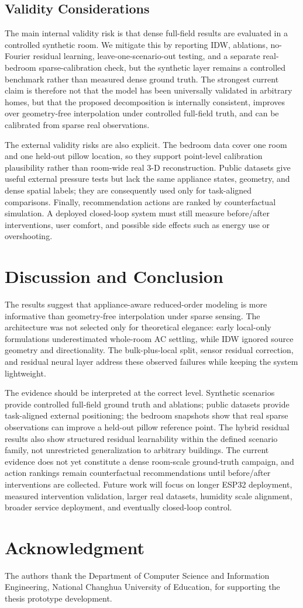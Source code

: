 \documentclass[conference]{IEEEtran}
\begin{document}
\subsection{Validity Considerations}
The main internal validity risk is that dense full-field results are evaluated in a controlled synthetic room. We mitigate this by reporting IDW, ablations, no-Fourier residual learning, leave-one-scenario-out testing, and a separate real-bedroom sparse-calibration check, but the synthetic layer remains a controlled benchmark rather than measured dense ground truth. The strongest current claim is therefore not that the model has been universally validated in arbitrary homes, but that the proposed decomposition is internally consistent, improves over geometry-free interpolation under controlled full-field truth, and can be calibrated from sparse real observations.

The external validity risks are also explicit. The bedroom data cover one room and one held-out pillow location, so they support point-level calibration plausibility rather than room-wide real 3-D reconstruction. Public datasets give useful external pressure tests but lack the same appliance states, geometry, and dense spatial labels; they are consequently used only for task-aligned comparisons. Finally, recommendation actions are ranked by counterfactual simulation. A deployed closed-loop system must still measure before/after interventions, user comfort, and possible side effects such as energy use or overshooting.

\section{Discussion and Conclusion}
The results suggest that appliance-aware reduced-order modeling is more informative than geometry-free interpolation under sparse sensing. The architecture was not selected only for theoretical elegance: early local-only formulations underestimated whole-room AC settling, while IDW ignored source geometry and directionality. The bulk-plus-local split, sensor residual correction, and residual neural layer address these observed failures while keeping the system lightweight.

The evidence should be interpreted at the correct level. Synthetic scenarios provide controlled full-field ground truth and ablations; public datasets provide task-aligned external positioning; the bedroom snapshots show that real sparse observations can improve a held-out pillow reference point. The hybrid residual results also show structured residual learnability within the defined scenario family, not unrestricted generalization to arbitrary buildings. The current evidence does not yet constitute a dense room-scale ground-truth campaign, and action rankings remain counterfactual recommendations until before/after interventions are collected. Future work will focus on longer ESP32 deployment, measured intervention validation, larger real datasets, humidity scale alignment, broader service deployment, and eventually closed-loop control.

\section*{Acknowledgment}
The authors thank the Department of Computer Science and Information Engineering, National Changhua University of Education, for supporting the thesis prototype development.



\end{document}
